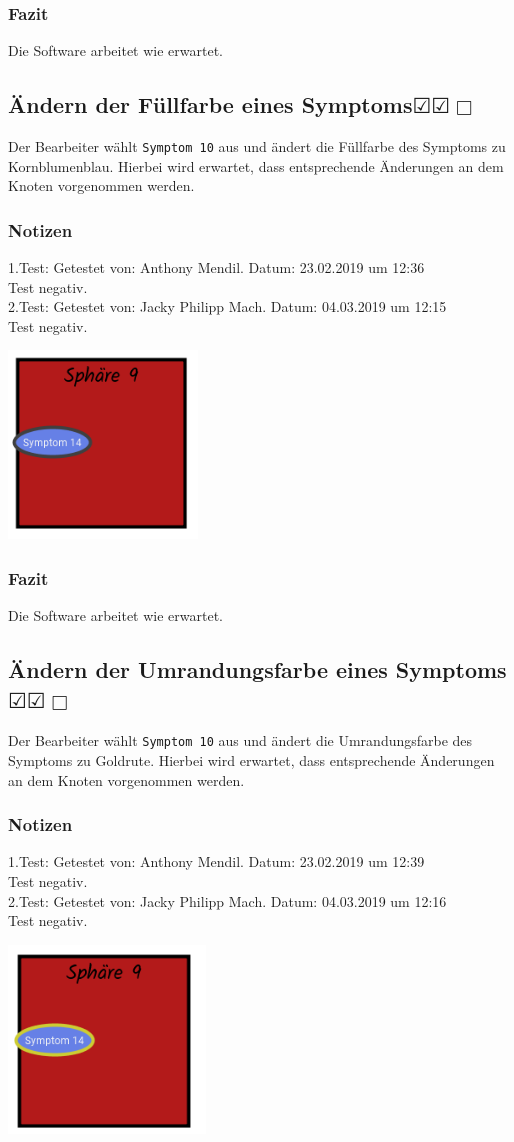 \documentclass[enabledeprecatedfontcommands]{scrartcl}
\newcommand{\subsectiont}[2]{\subsection[#1]{#1{\normalsize\normalfont #2}}}
\newcommand{\leer}{$\Box$}
\newcommand{\ok}{$\CheckedBox$}
\begin{document}
\subsubsection{Fazit}
Die Software arbeitet wie erwartet.

\subsectiont{Ändern der Füllfarbe eines Symptoms}{\dotfill\ok\ok\leer}
Der Bearbeiter wählt \texttt{Symptom 10} aus und ändert die Füllfarbe des Symptoms zu Kornblumenblau. Hierbei wird erwartet, dass entsprechende Änderungen an dem Knoten vorgenommen werden.
\subsubsection{Notizen}
1.Test: Getestet von: Anthony Mendil. Datum: 23.02.2019 um 12:36 \\
Test negativ.\\
2.Test: Getestet von: Jacky Philipp Mach. Datum: 04.03.2019 um 12:15 \\
Test negativ.
\begin{center}
\includegraphics[height=5cm]{2_25.PNG}
\end{center}
\subsubsection{Fazit}
Die Software arbeitet wie erwartet.

\subsectiont{Ändern der Umrandungsfarbe eines Symptoms}{\dotfill\ok\ok\leer}
Der Bearbeiter wählt \texttt{Symptom 10} aus und ändert die Umrandungsfarbe des Symptoms zu Goldrute. Hierbei wird erwartet, dass entsprechende Änderungen an dem Knoten vorgenommen werden.
\subsubsection{Notizen}
1.Test: Getestet von: Anthony Mendil. Datum: 23.02.2019 um 12:39 \\
Test negativ.\\
2.Test: Getestet von: Jacky Philipp Mach. Datum: 04.03.2019 um 12:16 \\
Test negativ.
\begin{center}
\includegraphics[height=5cm]{2_26.PNG}
\end{center}
\end{document}
